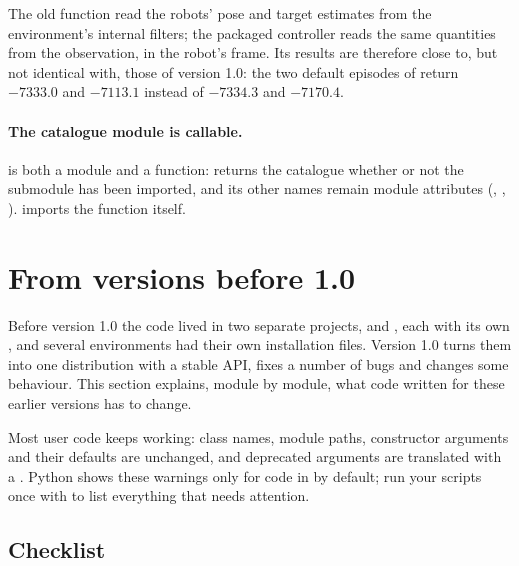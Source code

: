 The old function read the robots' pose and target estimates from the
environment's internal filters; the packaged controller reads the same
quantities from the observation, in the robot's frame. Its results are
therefore close to, but not identical with, those of version 1.0: the two
default episodes of  return $-7333.0$ and $-7113.1$
instead of $-7334.3$ and $-7170.4$.

\paragraph{The catalogue module is callable.}  is both a
module and a function:  returns the catalogue
whether or not the submodule has been imported, and its other names remain
module attributes (,
, ).
 imports the function itself.

\section{From versions before 1.0}\label{sec:migration-pre10}

Before version 1.0 the code lived in two separate projects,
 and , each with
its own , and several environments had their own installation
files. Version 1.0 turns them into one distribution with a stable API, fixes a
number of bugs and changes some behaviour. This section explains, module by
module, what code written for these earlier versions has to change.

Most user code keeps working: class names, module paths, constructor
arguments and their defaults are unchanged, and deprecated arguments are
translated with a . Python shows these warnings only
for code in  by default; run your scripts once with
 to list everything that needs
attention.

\subsection{Checklist}\label{sec:migration-checklist}

